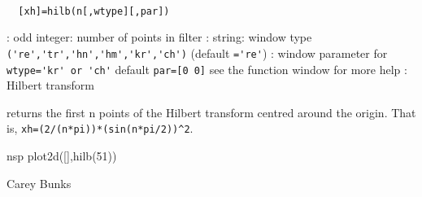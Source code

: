 
\begin{mandesc}
   \\ %
\end{mandesc}
\begin{calling_sequence}
\begin{verbatim}
  [xh]=hilb(n[,wtype][,par])  
\end{verbatim}
\end{calling_sequence}
\begin{parameters}
  \begin{varlist}
    : odd integer: number of points in filter
    : string: window type \verb!('re','tr','hn','hm','kr','ch')! (default \verb!='re'!)
    : window parameter for \verb!wtype='kr' or 'ch'! default \verb!par=[0 0]! see the function window for more help
    : Hilbert transform
  \end{varlist}
\end{parameters}
\begin{mandescription}
  returns the first n points of the
  Hilbert transform centred around the origin.
  That is, \verb!xh=(2/(n*pi))*(sin(n*pi/2))^2!.
\end{mandescription}
\begin{examples}
  \begin{mintednsp}{nsp}
    plot2d([],hilb(51))
  \end{mintednsp}
\end{examples}
\begin{authors}
    Carey Bunks  
\end{authors}
